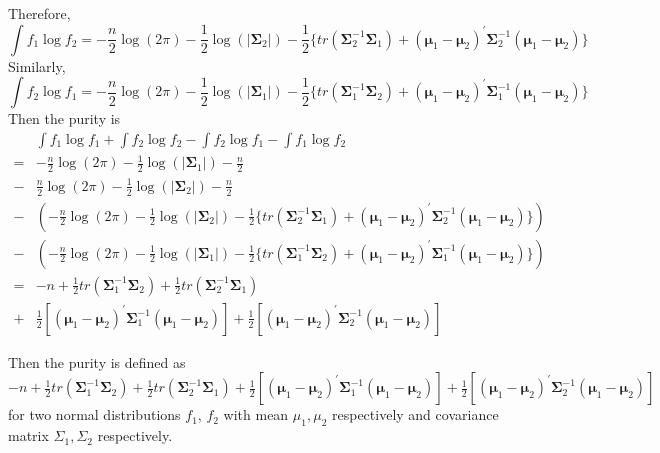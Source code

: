 \documentclass[11pt]{article}
\begin{document}
Therefore, 
\begin{equation}
    \int f_1 \log f_2 = -\frac{n}{2} \log(2\pi) - \frac{1}{2}\log(| \bm \Sigma_2 |) - \frac{1}{2} \big\{ tr(\bm \Sigma_2^{-1} \bm \Sigma_1) + (\bm \mu_1 - \bm \mu_2)^{\prime}\bm \Sigma_2^{-1}(\bm \mu_1 - \bm \mu_2) \big\}
\end{equation}
Similarly,
\begin{equation}
    \int f_2 \log f_1 = -\frac{n}{2} \log(2\pi) - \frac{1}{2}\log(| \bm \Sigma_1 |) - \frac{1}{2} \big\{ tr(\bm \Sigma_1^{-1} \bm \Sigma_2) + (\bm \mu_1 - \bm \mu_2)^{\prime}\bm \Sigma_1^{-1}(\bm \mu_1 - \bm \mu_2) \big\}
\end{equation}
Then the purity is 
\begin{equation}
\begin{aligned}
& \int f_1 \log f_1  + \int f_2 \log f_2  - \int f_2 \log f_1 -\int f_1 \log f_2 \\
= & -\frac{n}{2} \log(2\pi) - \frac{1}{2} \log(|\bm \Sigma_1|) -\frac{n}{2} \\
 - & \frac{n}{2} \log(2\pi) - \frac{1}{2} \log(|\bm \Sigma_2|) -\frac{n}{2}\\
- & (-\frac{n}{2} \log(2\pi) - \frac{1}{2}\log(| \bm \Sigma_2 |) - \frac{1}{2} \big\{ tr(\bm \Sigma_2^{-1} \bm \Sigma_1) + (\bm \mu_1 - \bm \mu_2)^{\prime}\bm \Sigma_2^{-1}(\bm \mu_1 - \bm \mu_2) \big\}) \\
- & (-\frac{n}{2} \log(2\pi) - \frac{1}{2}\log(| \bm \Sigma_1 |) - \frac{1}{2} \big\{ tr(\bm \Sigma_1^{-1} \bm \Sigma_2) + (\bm \mu_1 - \bm \mu_2)^{\prime}\bm \Sigma_1^{-1}(\bm \mu_1 - \bm \mu_2) \big\}) \\
= &  -n + \frac{1}{2} tr(\bm \Sigma_1^{-1} \bm \Sigma_2) + \frac{1}{2} tr(\bm \Sigma_2^{-1} \bm \Sigma_1) \\+ & \frac{1}{2} [(\bm \mu_1 - \bm \mu_2)^{\prime}\bm \Sigma_1^{-1}(\bm \mu_1 - \bm \mu_2)] + \frac{1}{2} [(\bm \mu_1 - \bm \mu_2)^{\prime}\bm \Sigma_2^{-1}(\bm \mu_1 - \bm \mu_2)] 
\end{aligned}
\end{equation}

\noindent
Then the purity is defined as 
$-n + \frac{1}{2} tr(\bm \Sigma_1^{-1} \bm \Sigma_2) + \frac{1}{2} tr(\bm \Sigma_2^{-1} \bm \Sigma_1)+  \frac{1}{2} [(\bm \mu_1 - \bm \mu_2)^{\prime}\bm \Sigma_1^{-1}(\bm \mu_1 - \bm \mu_2)] + \frac{1}{2} [(\bm \mu_1 - \bm \mu_2)^{\prime}\bm \Sigma_2^{-1}(\bm \mu_1 - \bm \mu_2)]$ for two normal distributions $f_1$, $f_2$ with mean $\mu_1, \mu_2$ respectively and covariance matrix $\Sigma_1, \Sigma_2$ respectively. 
\end{document}
